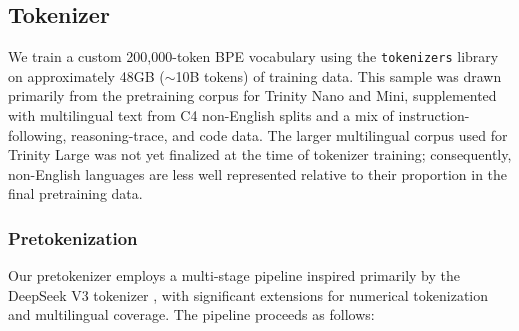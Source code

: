 \documentclass{article}
\begin{document}
\subsection{Tokenizer}

We train a custom 200,000-token BPE \citep{bpeshibata} vocabulary using the \texttt{tokenizers} library \citep{Moi_HuggingFace_s_Tokenizers_2023} on approximately 48GB ($\sim$10B tokens) of training data. This sample was drawn primarily from the pretraining corpus for Trinity Nano and Mini, supplemented with multilingual text from C4 non-English splits and a mix of instruction-following, reasoning-trace, and code data. The larger multilingual corpus used for Trinity Large was not yet finalized at the time of tokenizer training; consequently, non-English languages are less well represented relative to their proportion in the final pretraining data.

\subsubsection{Pretokenization}

Our pretokenizer employs a multi-stage pipeline inspired primarily by the DeepSeek V3 tokenizer \citep{deepseekai2025deepseekv3technicalreport}, with significant extensions for numerical tokenization and multilingual coverage. The pipeline proceeds as follows:
\end{document}
